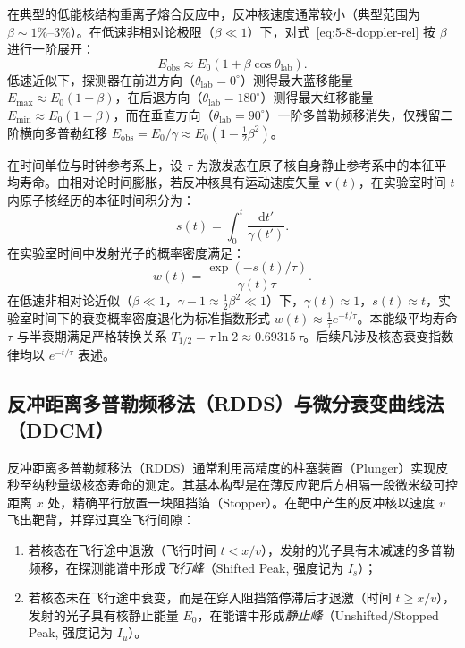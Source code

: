 在典型的低能核结构重离子熔合反应中，反冲核速度通常较小（典型范围为 $\beta \sim 1\%$–$3\%$）。在低速非相对论极限（$\beta \ll 1$）下，对式~\eqref{eq:5-8-doppler-rel} 按 $\beta$ 进行一阶展开：
\begin{equation}\label{eq:5-8-doppler-approx}
E_{\mathrm{obs}} \approx E_0 (1 + \beta \cos\theta_{\mathrm{lab}}).
\end{equation}
低速近似下，探测器在前进方向（$\theta_{\mathrm{lab}} = 0^\circ$）测得最大蓝移能量 $E_{\max} \approx E_0 (1 + \beta)$，在后退方向（$\theta_{\mathrm{lab}} = 180^\circ$）测得最大红移能量 $E_{\min} \approx E_0 (1 - \beta)$，而在垂直方向（$\theta_{\mathrm{lab}} = 90^\circ$）一阶多普勒频移消失，仅残留二阶横向多普勒红移 $E_{\mathrm{obs}} = E_0/\gamma \approx E_0 (1 - \frac{1}{2}\beta^2)$。

在时间单位与时钟参考系上，设 $\tau$ 为激发态在原子核自身静止参考系中的本征平均寿命。由相对论时间膨胀，若反冲核具有运动速度矢量 $\mathbf{v}(t)$，在实验室时间 $t$ 内原子核经历的本征时间积分为：
\begin{equation}\label{eq:5-8-proper-time-integral}
s(t) = \int_0^t \frac{\mathrm{d}t'}{\gamma(t')}.
\end{equation}
在实验室时间中发射光子的概率密度满足：
\begin{equation}\label{eq:5-8-lab-decay-density}
w(t) = \frac{\exp\left(-s(t)/\tau\right)}{\gamma(t) \tau}.
\end{equation}
在低速非相对论近似（$\beta \ll 1$，$\gamma - 1 \approx \frac{1}{2}\beta^2 \ll 1$）下，$\gamma(t) \approx 1$，$s(t) \approx t$，实验室时间下的衰变概率密度退化为标准指数形式 $w(t) \approx \frac{1}{\tau} e^{-t/\tau}$。本能级平均寿命 $\tau$ 与半衰期满足严格转换关系 $T_{1/2} = \tau \ln 2 \approx 0.69315\,\tau$。后续凡涉及核态衰变指数律均以 $e^{-t/\tau}$ 表述。

\subsection{反冲距离多普勒频移法（RDDS）与微分衰变曲线法（DDCM）}\label{subsec:5-8-2}

反冲距离多普勒频移法（RDDS）通常利用高精度的柱塞装置（Plunger）实现皮秒至纳秒量级核态寿命的测定。其基本构型是在薄反应靶后方相隔一段微米级可控距离 $x$ 处，精确平行放置一块阻挡箔（Stopper）。在靶中产生的反冲核以速度 $v$ 飞出靶背，并穿过真空飞行间隙：
\begin{enumerate}
\item 若核态在飞行途中退激（飞行时间 $t < x/v$），发射的光子具有未减速的多普勒频移，在探测能谱中形成\emph{飞行峰}（Shifted Peak, 强度记为 $I_s$）；
\item 若核态未在飞行途中衰变，而是在穿入阻挡箔停滞后才退激（时间 $t \ge x/v$），发射的光子具有核静止能量 $E_0$，在能谱中形成\emph{静止峰}（Unshifted/Stopped Peak, 强度记为 $I_u$）。
\end{enumerate}

